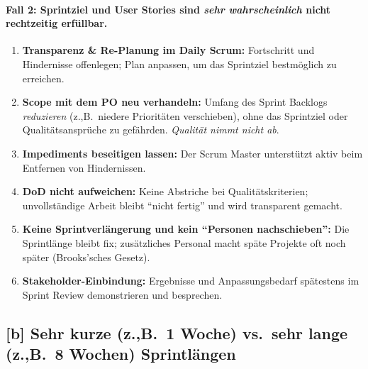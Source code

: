 \documentclass[12pt]{article}
\begin{document}
\paragraph{Fall 2: Sprintziel und User Stories sind \emph{sehr wahrscheinlich} nicht rechtzeitig erfüllbar.}
\begin{enumerate}
\item \textbf{Transparenz & Re-Planung im Daily Scrum:} Fortschritt und Hindernisse offenlegen; Plan anpassen, um das Sprintziel bestmöglich zu erreichen. 
\item \textbf{Scope mit dem PO neu verhandeln:} Umfang des Sprint Backlogs \emph{reduzieren} (z.,B.\ niedere Prioritäten verschieben), ohne das Sprintziel oder Qualitätsansprüche zu gefährden. \emph{Qualität nimmt nicht ab}. 
\item \textbf{Impediments beseitigen lassen:} Der Scrum Master unterstützt aktiv beim Entfernen von Hindernissen. 
\item \textbf{DoD nicht aufweichen:} Keine Abstriche bei Qualitätskriterien; unvollständige Arbeit bleibt \enquote{nicht fertig} und wird transparent gemacht. 
\item \textbf{Keine Sprintverlängerung und kein \enquote{Personen nachschieben}:} Die Sprintlänge bleibt fix; zusätzliches Personal macht späte Projekte oft noch später (Brooks’sches Gesetz). 
\item \textbf{Stakeholder-Einbindung:} Ergebnisse und Anpassungsbedarf spätestens im Sprint Review demonstrieren und besprechen. 
\end{enumerate}

\subsection*{[b] Sehr kurze (z.,B.\ 1 Woche) vs.\ sehr lange (z.,B.\ 8 Wochen) Sprintlängen}
\end{document}
